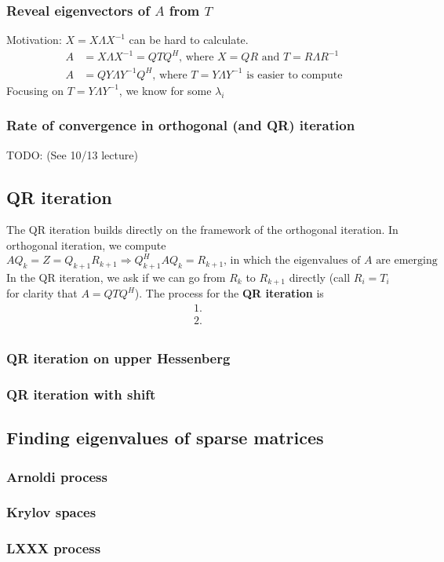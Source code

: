 \documentclass{article}
\begin{document}
\subsubsection{Reveal eigenvectors of $A$ from $T$}
Motivation: $X = X\Lambda X^{-1}$ can be hard to calculate.
\begin{align*}
    A &= X\Lambda X^{-1} = QTQ^H \textrm{, where $X = QR$ and $T = R\Lambda R^{-1}$}\\
    A &= QY\Lambda Y^{-1}Q^H \textrm{, where $T = Y \Lambda Y^{-1}$ is easier to compute}
\end{align*}
Focusing on $T = Y \Lambda Y^{-1}$, we know for some $\lambda_i$

\subsubsection{Rate of convergence in orthogonal (and QR) iteration}
TODO: (See 10/13 lecture)

\subsection{QR iteration}
The QR iteration builds directly on the framework of the orthogonal iteration. In orthogonal iteration, we compute
\begin{equation*}
    AQ_k = Z = Q_{k+1}R_{k+1} \Rightarrow Q_{k+1}^HAQ_k = R_{k+1} \textrm{, in which the eigenvalues of $A$ are emerging}
\end{equation*} 
In the QR iteration, we ask if we can go from $R_k$ to $R_{k+1}$ directly (call $R_i = T_i$ for clarity that $A = QTQ^H$). The process for the \textbf{QR iteration} is
\begin{align*}
    1. \;&\\
    2. \;&\\
\end{align*}

\subsubsection{QR iteration on upper Hessenberg}
\subsubsection{QR iteration with shift}
\subsection{Finding eigenvalues of sparse matrices}
\subsubsection{Arnoldi process}
\subsubsection{Krylov spaces}
\subsubsection{LXXX process}
\end{document}
